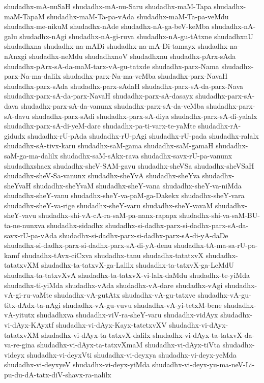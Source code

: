 {shudadhx-mA-nuSaH
shudadhx-mA-nu-Saru
shudadhx-maM-Tapa
shudadhx-maM-TapaM
shudadhx-maM-Ta-pa-vAda
shudadhx-maM-Ta-pa-veMdu
shudadhx-me-nikuM
shudadhx-nAde
shudadhx-nA-ga-beV-keMba
shudadhx-nA-galu
shudadhx-nAgi
shudadhx-nA-gi-ruva
shudadhx-nA-gu-tAtxne
shudadhxnU
shudadhxna
shudadhx-na-mADi
shudadhx-na-mA-Di-tamayx
shudadhx-na-nAnxgi
shudadhx-neMdu
shudadhxnoV
shudadhxnu
shudadhx-pArx-sAda
shudadhx-pArx-sA-da-maM-tarx-vA-gu-tatxde
shudadhx-parx-Nama
shudadhx-parx-Na-ma-dalilx
shudadhx-parx-Na-ma-veMba
shudadhx-parx-NavaH
shudadhx-parx-sAda
shudadhx-parx-sAdaH
shudadhx-parx-sA-da-parx-Nava
shudadhx-parx-sA-da-parx-NavaH
shudadhx-parx-sA-dasayx
shudadhx-parx-sA-dava
shudadhx-parx-sA-da-vanunx
shudadhx-parx-sA-da-veMba
shudadhx-parx-sA-davu
shudadhx-parx-sAdi
shudadhx-parx-sA-diya
shudadhx-parx-sA-di-yalalx
shudadhx-parx-sA-di-yeM-dare
shudadhx-pa-ti-varx-te-yaMte
shudadhx-rA-gidudx
shudadhx-rU-pAda
shudadhx-rU-pAgi
shudadhx-rU-pada
shudadhx-ralalx
shudadhx-sA-tivx-karu
shudadhx-saM-gama
shudadhx-saM-gamaH
shudadhx-saM-ga-ma-dalilx
shudadhx-saM-sAkx-rava
shudadhx-savx-rU-pa-vanunx
shudadhxshacx
shudadhx-sheV-SAM-gavu
shudadhx-sheVSa
shudadhx-sheVSaH
shudadhx-sheV-Sa-vanunx
shudadhx-sheYvA
shudadhx-sheYva
shudadhx-sheYvaH
shudadhx-sheYvaM
shudadhx-sheY-vana
shudadhx-sheY-va-niMda
shudadhx-sheY-vanu
shudadhx-sheY-va-paM-ga-Dakekx
shudadhx-sheY-vara
shudadhx-sheY-va-rige
shudadhx-sheY-varu
shudadhx-sheY-vavaM
shudadhx-sheY-vavu
shudadhx-shi-vA-cA-ra-saM-pa-nanx-rapapx
shudadhx-shi-va-saM-BU-ta-ne-nunxva
shudadhx-sidadhx
shudadhx-si-dadhx-parx-si-dadhx-parx-sA-da-savx-rU-pa-vAda
shudadhx-si-dadhx-parx-si-dadhx-parx-sA-di-yA-daDe
shudadhx-si-dadhx-parx-si-dadhx-parx-sA-di-yA-denu
shudadhx-tA-ma-sa-rU-pa-kamf
shudadhx-tAvx-ciCxva
shudadhx-tanu
shudadhx-tatatxvX
shudadhx-tatatxvXM
shudadhx-ta-tatxvX-ga-Lalilx
shudadhx-ta-tatxvX-ga-LeMdU
shudadhx-ta-tatxvXvA
shudadhx-ta-tatxvX-vi-lalx-daMdu
shudadhx-te-yiMda
shudadhx-ti-yiMda
shudadhx-vAda
shudadhx-vA-dare
shudadhx-vAgi
shudadhx-vA-gi-ru-vaMte
shudadhx-vA-gutAtx
shudadhx-vA-gu-tatxve
shudadhx-vA-gu-titx-dAdx-ta-nAgi
shudadhx-vA-gu-vuvu
shudadhx-vA-yi-tetxM-bene
shudadhx-vA-yitutx
shudadhxva
shudadhx-viV-ra-sheY-varu
shudadhx-vidAyx
shudadhx-vi-dAyx-KAyxtf
shudadhx-vi-dAyx-Kayx-tatetxvXV
shudadhx-vi-dAyx-tatatxvXM
shudadhx-vi-dAyx-ta-tatxvX-dalilx
shudadhx-vi-dAyx-ta-tatxvX-da-va-re-gina
shudadhx-vi-dAyx-ta-tatxvXmaM
shudadhx-vi-dAyx-tiVta
shudadhx-videyx
shudadhx-vi-deyxVti
shudadhx-vi-deyxya
shudadhx-vi-deyx-yeMda
shudadhx-vi-deyxyeV
shudadhx-vi-deyx-yiMda
shudadhx-vi-deyx-yu-ma-neV-Li-pu-du-dA-tatx-diV-shavx-ra-nalilx
}

